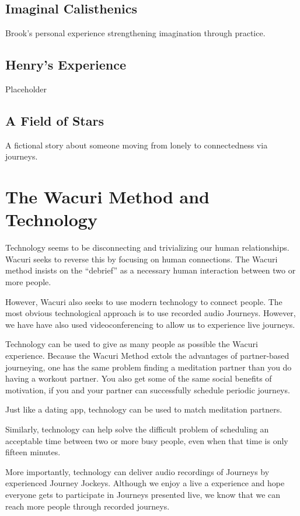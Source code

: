 \documentclass[12pt]{book}
\begin{document}
\section{Imaginal Calisthenics}

Brook's personal experience strengthening imagination through practice.

\section{Henry's Experience}

Placeholder 

\section{A Field of Stars}

A fictional story about someone moving from lonely to connectedness via journeys.
\chapter{The Wacuri Method and Technology}

Technology seems to be disconnecting and trivializing our human relationships.
Wacuri seeks to reverse this by focusing on human connections. The Wacuri method
insists on the ``debrief'' as a necessary human interaction between two or more people.

However, Wacuri also seeks to use modern technology to connect people.
The most obvious technological approach is to use recorded audio Journeys.
However, we have have also used videoconferencing to allow us to experience live journeys.

Technology can be used to give as many people as possible the Wacuri experience.
Because the Wacuri Method extols the advantages of partner-based journeying,
one has the same problem finding a meditation partner than you do having a
workout partner. You also get some of the same social benefits of motivation,
if you and your partner can successfully schedule periodic journeys.

Just like a dating app, technology can be used to match meditation partners.

Similarly, technology can help solve the difficult problem of scheduling an
acceptable time between two or more busy people, even when that time is only fifteen minutes.

More importantly, technology can deliver audio recordings of Journeys by
experienced Journey Jockeys. Although we enjoy a live a experience and hope
everyone gets to participate in Journeys presented live, we know that we
can reach more people through recorded journeys.
\end{document}
